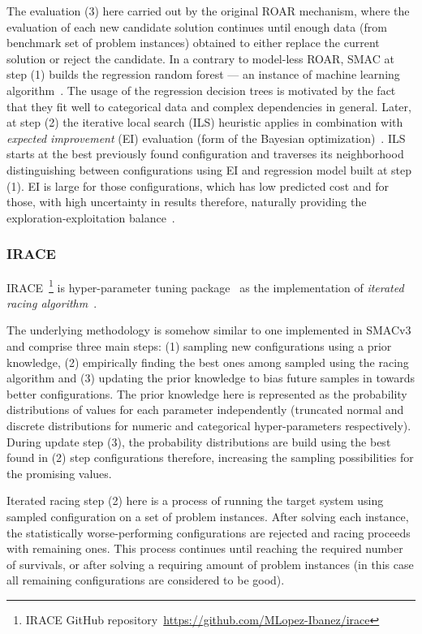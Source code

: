 The evaluation (3) here carried out by the original ROAR mechanism, where the evaluation of each new candidate solution continues until enough data (from benchmark set of problem instances) obtained to either replace the current solution or reject the candidate. In a contrary to model-less ROAR, SMAC at step (1) builds the regression random forest — an instance of machine learning algorithm~\cite{breiman2001random}. The usage of the regression decision trees is motivated by the fact that they fit well to categorical data and complex dependencies in general. Later, at step (2) the iterative local search (ILS) heuristic applies in combination with \emph{expected improvement} (EI) evaluation (form of the Bayesian optimization)~\cite{shahriari2015taking}. ILS starts at the best previously found configuration and traverses its neighborhood distinguishing between configurations using EI and regression model built at step (1). EI is large for those configurations, which has low predicted cost and for those, with high uncertainty in results therefore, naturally providing the exploration-exploitation balance~\cite{jones1998efficient}.


\subsubsection{IRACE}\label{bg: irace}
IRACE~\footnote{IRACE GitHub repository~\url{https://github.com/MLopez-Ibanez/irace}} is hyper-parameter tuning package~\cite{lopez2016irace} as the implementation of \emph{iterated racing algorithm}~\cite{birattari2010f}.

The underlying methodology is somehow similar to one implemented in SMACv3 and comprise three main steps: (1) sampling new configurations using a prior knowledge, (2) empirically finding the best ones among sampled using the racing algorithm and (3) updating the prior knowledge to bias future samples in towards better configurations. The prior knowledge here is represented as the probability distributions of values for each parameter independently (truncated normal and discrete distributions for numeric and categorical hyper-parameters respectively). During update step (3), the probability distributions are build using the best found in (2) step configurations therefore, increasing the sampling possibilities for the promising values.

Iterated racing step (2) here is a process of running the target system using sampled configuration on a set of problem instances. After solving each instance, the statistically worse-performing configurations are rejected and racing proceeds with remaining ones. This process continues until reaching the required number of survivals, or after solving a requiring amount of problem instances (in this case all remaining configurations are considered to be good). 

